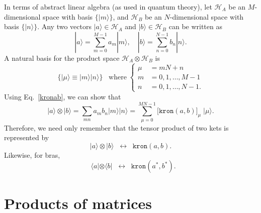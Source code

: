 \documentclass[pra,12pt]{revtex4}
\begin{document}
In terms of abstract linear algebra (as used in quantum theory), let
$\mathscr{H}_A$ be an $M$-dimensional space with basis
$\{|m\rangle\}$, and $\mathscr{H}_B$ be an $N$-dimensional space with
basis $\{|n\rangle\}$.  Any two vectors $|a\rangle \in \mathscr{H}_A$
and $|b\rangle \in \mathscr{H}_B$ can be written as
\begin{equation}
  |a\rangle = \sum_{m=0}^{M-1} a_m |m\rangle, \quad |b\rangle = \sum_{n=0}^{N-1} b_n |n\rangle.
\end{equation}
A natural basis for the product space $\mathscr{H}_A\otimes
\mathscr{H}_B$ is
\begin{equation}
  \Big\{|\mu\rangle \equiv |m\rangle |n\rangle\Big\}
  \;\;\;\mathrm{where} \;
  \begin{cases}
    \mu\!\!\!\! &= mN+n \\
    m \!\!\!\!&= 0,1,\dots,M-1 \\
    n \!\!\!\!&= 0,1, \dots, N-1.
  \end{cases}
  \label{mubasis}
\end{equation}
Using Eq.~\eqref{kronab}, we can show that
\begin{equation}
  |a\rangle\otimes|b\rangle
  = \sum_{mn} a_m b_n |m\rangle |n\rangle
  = \sum_{\mu=0}^{MN-1} \big[\texttt{kron}(a,b)\big]_\mu \; |\mu\rangle.
\end{equation}
Therefore, we need only remember that the tensor product of two
kets is represented by
\begin{equation}
  |a\rangle\otimes|b\rangle \;\;\leftrightarrow\;\;
  \texttt{kron}(a,b).
  \label{result1}
\end{equation}
Likewise, for bras,
\begin{equation}
  \;\;\,\langle a| \otimes \langle b| \;\;\leftrightarrow\;\;
  \texttt{kron}(a^*,b^*).
  \label{result1a}
\end{equation}

\section{Products of matrices}
\end{document}
